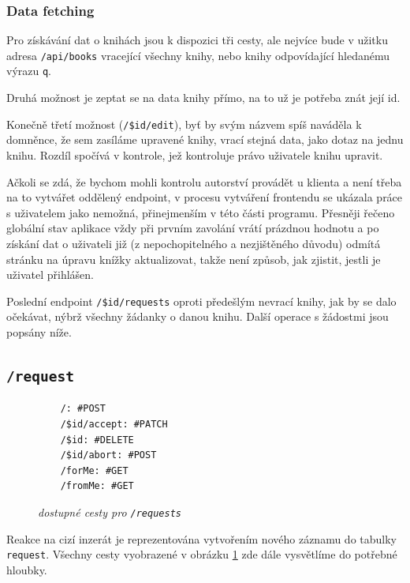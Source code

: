 \documentclass[a4paper,oneside,12pt]{report}
\begin{document}
\subsubsection{Data fetching}
Pro získávání dat o knihách jsou k dispozici tři cesty, ale nejvíce bude v užitku adresa
\texttt{/api/books} vracející všechny knihy, nebo knihy odpovídající hledanému výrazu
\texttt{q}.

Druhá možnost je zeptat se na data knihy přímo, na to už je potřeba znát její id.

Konečně třetí možnost (\texttt{/\$id/edit}), byť by svým názvem spíš naváděla k
domněnce, že sem zasíláme upravené knihy, vrací stejná data, jako dotaz na jednu knihu.
Rozdíl spočívá v kontrole, jež kontroluje právo uživatele knihu upravit.

Ačkoli se zdá, že bychom mohli kontrolu autorství provádět u klienta a není třeba na to
vytvářet oddělený endpoint, v procesu vytváření frontendu se ukázala práce s\,\,uživatelem
jako nemožná, přinejmenším v této části programu. Přesněji řečeno globální stav aplikace
vždy při prvním zavolání vrátí prázdnou hodnotu a po získání dat o\,\,uživateli již (z
nepochopitelného a nezjištěného důvodu) odmítá stránku na úpravu knížky aktualizovat,
takže není způsob, jak zjistit, jestli je uživatel přihlášen.

\vspace{1em}
Poslední endpoint \texttt{/\$id/requests} oproti předešlým nevrací knihy, jak by se dalo
očekávat, nýbrž všechny žádanky o danou knihu. Další operace s žádostmi jsou popsány níže.

\subsection{\texttt{/request}}
\begin{figure}
	\vspace{-6.5mm}
	\caption{\textit{dostupné cesty pro \texttt{/requests}}}\label{fig:/request}
	\vspace{-6.5mm}
	\begin{verbatim}
	/: #POST
	/$id/accept: #PATCH
	/$id: #DELETE
	/$id/abort: #POST
	/forMe: #GET
	/fromMe: #GET
  \end{verbatim}
\end{figure}


Reakce na cizí inzerát je reprezentována vytvořením nového záznamu do tabulky
\texttt{request}. Všechny cesty vyobrazené v obrázku \ref{fig:/request} zde
dále vysvětlíme do potřebné hloubky.
\end{document}
